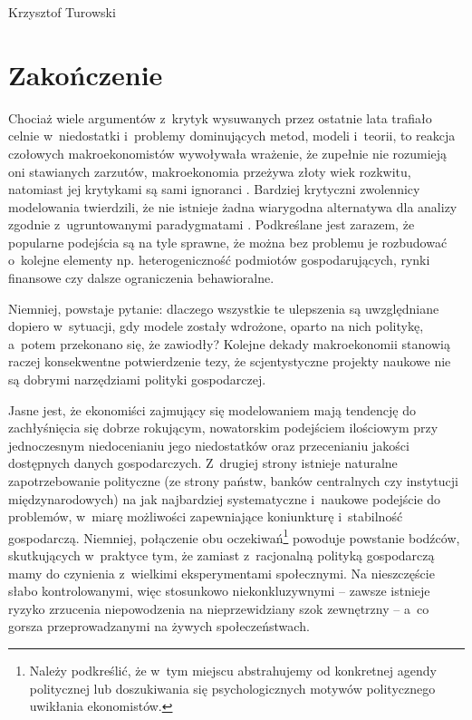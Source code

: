 \begin{artplenv}{Krzysztof Turowski}
\section*{Zakończenie}
Chociaż wiele argumentów z~krytyk wysuwanych przez ostatnie lata trafiało celnie w~niedostatki i~problemy dominujących
metod, modeli i~teorii, to reakcja czołowych makroekonomistów wywoływała wrażenie, że zupełnie nie rozumieją oni
stawianych zarzutów, makroekonomia przeżywa złoty wiek rozkwitu, natomiast jej krytykami są sami ignoranci
\parencite{lucas_defence_2009,sargent_interview_2010}.
Bardziej krytyczni zwolennicy modelowania twierdzili, że nie
istnieje żadna wiarygodna alternatywa dla analizy zgodnie z~ugruntowanymi paradygmatami
\parencite{blanchard_tienen_2016,korinek_thoughts_2017}.
Podkreślane jest zarazem, że popularne podejścia są na tyle
sprawne, że można bez problemu je rozbudować o~kolejne elementy np. heterogeniczność podmiotów gospodarujących, rynki finansowe czy
dalsze ograniczenia behawioralne.

Niemniej, powstaje pytanie: dlaczego wszystkie te ulepszenia są uwzględniane dopiero w~sytuacji, gdy modele zostały
wdrożone, oparto na nich politykę, a~potem przekonano się, że zawiodły? Kolejne dekady makroekonomii stanowią raczej
konsekwentne potwierdzenie tezy, że scjentystyczne projekty naukowe nie są dobrymi narzędziami polityki gospodarczej.

Jasne jest, że ekonomiści zajmujący się modelowaniem mają tendencję do zachłyśnięcia się dobrze rokującym, nowatorskim
podejściem ilościowym przy jednoczesnym niedocenianiu jego niedostatków oraz przecenianiu jakości dostępnych danych
gospodarczych. Z~drugiej strony istnieje naturalne zapotrzebowanie polityczne (ze strony państw, banków centralnych czy
instytucji międzynarodowych) na jak najbardziej systematyczne i~naukowe podejście do problemów, w~miarę możliwości
zapewniające koniunkturę i~stabilność gospodarczą. Niemniej, połączenie obu oczekiwań\footnote{Należy podkreślić,
że w~tym miejscu abstrahujemy od konkretnej agendy politycznej lub doszukiwania się psychologicznych motywów politycznego
uwikłania ekonomistów.} powoduje powstanie bodźców, skutkujących w~praktyce tym, że zamiast z~racjonalną polityką
gospodarczą mamy do czynienia z~wielkimi eksperymentami społecznymi. Na nieszczęście słabo kontrolowanymi, więc
stosunkowo niekonkluzywnymi  --  zawsze istnieje ryzyko zrzucenia niepowodzenia na nieprzewidziany szok
zewnętrzny  --  a~co gorsza przeprowadzanymi na żywych społeczeństwach.


\end{artplenv}
